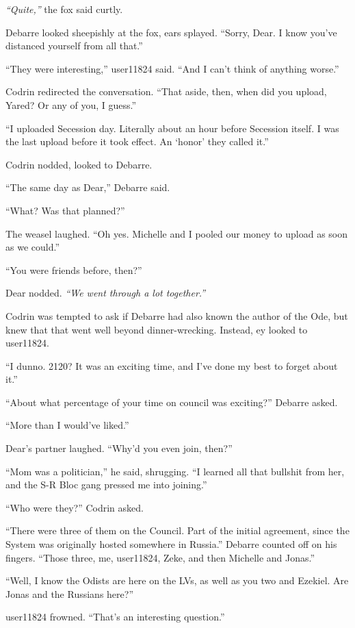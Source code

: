 \emph{``Quite,''} the fox said curtly.

Debarre looked sheepishly at the fox, ears splayed. ``Sorry, Dear. I know you've distanced yourself from all that.''

``They were interesting,'' user11824 said. ``And I can't think of anything worse.''

Codrin redirected the conversation. ``That aside, then, when did you upload, Yared? Or any of you, I guess.''

``I uploaded Secession day. Literally about an hour before Secession itself. I was the last upload before it took effect. An `honor' they called it.''

Codrin nodded, looked to Debarre.

``The same day as Dear,'' Debarre said.

``What? Was that planned?''

The weasel laughed. ``Oh yes. Michelle and I pooled our money to upload as soon as we could.''

``You were friends before, then?''

Dear nodded. \emph{``We went through a lot together.''}

Codrin was tempted to ask if Debarre had also known the author of the Ode, but knew that that went well beyond dinner-wrecking. Instead, ey looked to user11824.

``I dunno. 2120? It was an exciting time, and I've done my best to forget about it.''

``About what percentage of your time on council was exciting?'' Debarre asked.

``More than I would've liked.''

Dear's partner laughed. ``Why'd you even join, then?''

``Mom was a politician,'' he said, shrugging. ``I learned all that bullshit from her, and the S-R Bloc gang pressed me into joining.''

``Who were they?'' Codrin asked.

``There were three of them on the Council. Part of the initial agreement, since the System was originally hosted somewhere in Russia.'' Debarre counted off on his fingers. ``Those three, me, user11824, Zeke, and then Michelle and Jonas.''

``Well, I know the Odists are here on the LVs, as well as you two and Ezekiel. Are Jonas and the Russians here?''

user11824 frowned. ``That's an interesting question.''


